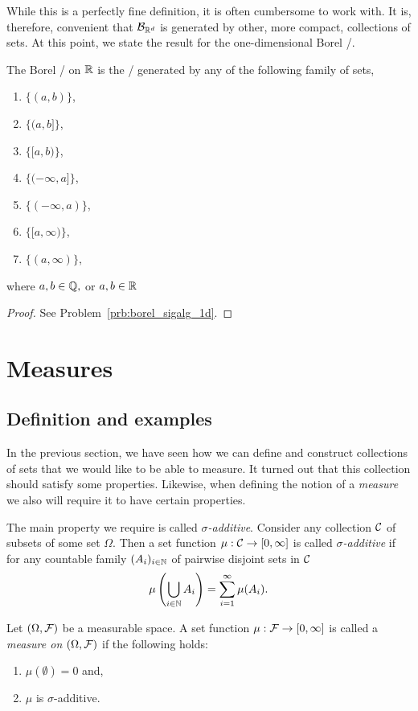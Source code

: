 While this is a perfectly fine definition, it is often cumbersome to work with. It is, therefore, convenient that $\mathcal B_{\mathbb R^d}$ is generated by other, more compact, collections of sets. At this point, we state the result for the one-dimensional Borel \sigalg/. 

\begin{proposition}\label{prop:characterization_borel_sigalg_1d}
The Borel \sigalg/ on $\mathbb R$ is the \sigalg/ generated by any of the following family of sets, 
\begin{enumerate}[label={(\arabic*)}]
\item $\{(a, b)\}$,
\item $\{(a, b]\}$,
\item $\{[a, b)\}$,
\item $\{(-\infty,a]\}$,
\item $\{(-\infty,a)\}$,
\item $\{[a, \infty)\}$,
\item $\{(a,\infty)\}$,
\end{enumerate}
where $a, b \in \mathbb Q,$ or $a, b \in \mathbb R$
\end{proposition}

\begin{proof}
See Problem~\ref{prb:borel_sigalg_1d}.
\end{proof}

\section{Measures}

\subsection{Definition and examples}
In the previous section, we have seen how we can define and construct collections of sets that we would like to be able to measure. It turned out that this collection should satisfy some properties. Likewise, when defining the notion of a \emph{measure} we also will require it to have certain properties.

The main property we require is called \emph{$\sigma$-additive}. Consider any collection $\mathcal C$ of subsets of some set $\Omega$. Then a set function $\mu : \mathcal C \to [0,\infty]$ is called \emph{$\sigma$-additive} if for any countable family $(A_i)_{i \in \mathbb N}$ of pairwise disjoint sets in $\mathcal C$
\[
	\mu\left(\bigcup_{i \in \mathbb N} A_i\right) = \sum_{i = 1}^\infty \mu(A_i).
\]

\begin{definition}[Measure]\label{def:measure}
Let $(\Omega, \mathcal F)$ be a measurable space. A set function $\mu : \mathcal F \to [0,\infty]$ is called a \emph{measure on $(\Omega, \mathcal F)$} if the following holds:
\begin{enumerate}[label={(\arabic*)}]
\item $\mu(\emptyset) = 0$ and,
\item $\mu$ is $\sigma$-additive.
\end{enumerate}
\end{definition}


